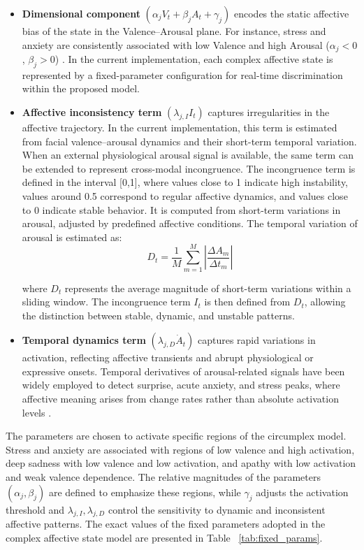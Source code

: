 \documentclass[letterpaper, 10 pt, conference]{ieeeconf}  %
\begin{document}
\begin{itemize}
    \item \textbf{Dimensional component} $(\alpha_j V_t + \beta_j A_t + \gamma_j)$  encodes the static affective bias of the state in the Valence--Arousal plane. For instance, stress and anxiety are consistently associated with low Valence and high Arousal ($\alpha_j < 0$, $\beta_j > 0$) \cite{scherer2005emotions}. In the current implementation, each complex affective state is represented by a fixed-parameter configuration for real-time discrimination within the proposed model.

    \item \textbf{Affective inconsistency term} $(\lambda_{j,I} I_t)$ captures irregularities in the affective trajectory. In the current implementation, this term is estimated from facial valence--arousal dynamics and their short-term temporal variation. When an external physiological arousal signal is available, the same term can be extended to represent cross-modal incongruence. The incongruence term is defined in the interval [0,1], where values close to 1 indicate high instability, values around 0.5 correspond to regular affective dynamics, and values close to 0 indicate stable behavior. It is computed from short-term variations in arousal, adjusted by predefined affective conditions. The temporal variation of arousal is estimated as:
\begin{equation}
D_t=\frac{1}{M}\sum_{m=1}^{M}\left|\frac{\Delta A_m}{\Delta t_m}\right|
\end{equation}

where \(D_t\) represents the average magnitude of short-term variations within a sliding window. The incongruence term \(I_t\) is then defined from \(D_t\), allowing the distinction between stable, dynamic, and unstable patterns.

    \item \textbf{Temporal dynamics term} $(\lambda_{j,D} \dot{A}_t)$  captures rapid variations in activation, reflecting affective transients and abrupt physiological or expressive onsets. Temporal derivatives of arousal-related signals have been widely employed to detect surprise, acute anxiety, and stress peaks, where affective meaning arises from change rates rather than absolute activation levels \cite{kuppens2010emotional, cowie2011emotion, wang2024physioformer}.
\end{itemize}

The parameters are chosen to activate specific regions of the circumplex model. Stress and anxiety are associated with regions of low valence and high activation, deep sadness with low valence and low activation, and apathy with low activation and weak valence dependence. The relative magnitudes of the parameters $(\alpha_j, \beta_j)$ are defined to emphasize these regions, while $\gamma_j$ adjusts the activation threshold and $\lambda_{j,I}, \lambda_{j,D}$ control the sensitivity to dynamic and inconsistent affective patterns. The exact values of the fixed parameters adopted in the complex affective state model are presented in Table ~\ref{tab:fixed_params}.
\end{document}
